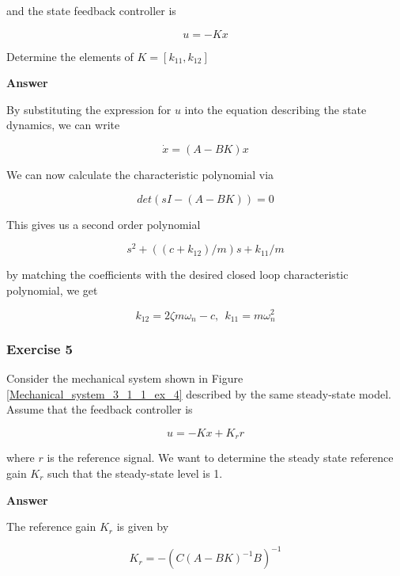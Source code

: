 and the state feedback controller is 

\begin{equation}
u = -Kx  
\end{equation}

Determine the elements of $K=[k_{11}, k_{12}]$

\textbf{Answer}

By substituting the expression for $u$ into the equation describing the state dynamics, we can write

\begin{equation}
\dot{x} = (A - BK)x
\end{equation}

We can now calculate the characteristic polynomial via


\begin{equation}
det(s I - (A - BK)) = 0
\end{equation}

This gives us a second order polynomial

\begin{equation}
s^2 + ((c + k_{12})/m)s + k_{11}/m
\end{equation}

by matching the coefficients with the desired closed loop characteristic polynomial, we get

\begin{equation}
k_{12} = 2 \zeta m\omega_{n} -c, ~~ k_{11} = m \omega_{n}^{2}
\end{equation}

\subsubsection{Exercise 5}

Consider the mechanical system shown in Figure \ref{Mechanical_system_3_1_1_ex_4} described by the same steady-state model. Assume that the feedback controller is

\begin{equation}
u = -Kx + K_r r 
\end{equation} 

where $r$ is the reference signal. We want to determine the steady state reference gain $K_r$ such that the steady-state level is 1.

\textbf{Answer}

The reference gain $K_r$ is given by 

\begin{equation}
K_r = - ( C(A-BK)^{-1}B)^{-1} 
\end{equation}

